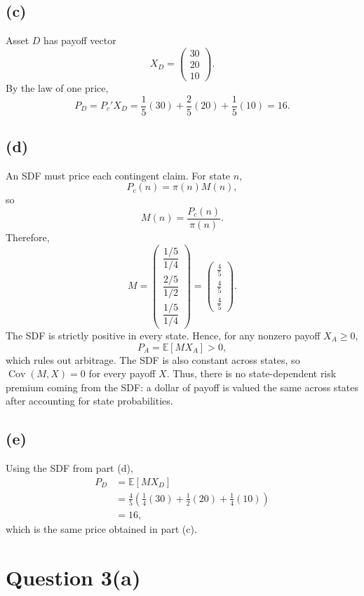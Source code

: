 \subsection*{(c)}

Asset $D$ has payoff vector
\[
X_D=
\begin{pmatrix}
30\\
20\\
10
\end{pmatrix}.
\]
By the law of one price,
\[
P_D=P_c'X_D
=\frac{1}{5}(30)+\frac{2}{5}(20)+\frac{1}{5}(10)
=16.
\]

\subsection*{(d)}

An SDF must price each contingent claim. For state $n$,
\[
P_c(n)=\pi(n)M(n),
\]
so
\[
M(n)=\frac{P_c(n)}{\pi(n)}.
\]
Therefore,
\[
M=
\begin{pmatrix}
\dfrac{1/5}{1/4}\\[4pt]
\dfrac{2/5}{1/2}\\[4pt]
\dfrac{1/5}{1/4}
\end{pmatrix}
=
\begin{pmatrix}
\frac{4}{5}\\
\frac{4}{5}\\
\frac{4}{5}
\end{pmatrix}.
\]
The SDF is strictly positive in every state. Hence, for any nonzero payoff
$X_A\geq 0$,
\[
P_A=\mathbb{E}[MX_A]>0,
\]
which rules out arbitrage. The SDF is also constant across states, so
$\operatorname{Cov}(M,X)=0$ for every payoff $X$. Thus, there is no
state-dependent risk premium coming from the SDF: a dollar of payoff is valued
the same across states after accounting for state probabilities.

\subsection*{(e)}

Using the SDF from part (d),
\begin{align*}
P_D
&=\mathbb{E}[MX_D] \\
&=\frac{4}{5}\left(\frac{1}{4}(30)+\frac{1}{2}(20)
    +\frac{1}{4}(10)\right) \\
&=16,
\end{align*}
which is the same price obtained in part (c).

\section*{Question 3(a)}

